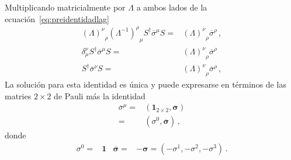 \begin{frame}
Multiplicando matricialmente por $\Lambda$ a ambos lados de la ecuación~\eqref{eq:preidentidadlag}
\begin{align}
\label{eq:ltrincond}
{\left(\Lambda\right)^\nu}_\rho{\left(\Lambda^{-1}\right)^\rho}_\mu   S^{\dagger}\overline{\sigma}^\mu S=&
{\left(\Lambda\right)^\nu}_\rho \overline{\sigma}^\rho\,,\nonumber\\
\delta^{\nu}_{\mu}   S^{\dagger}\overline{\sigma}^\mu S=&
{\left(\Lambda\right)^\nu}_\rho \overline{\sigma}^\rho \nonumber\\
S^{\dagger}\overline{\sigma}^\nu S=&{\left(\Lambda\right)^\nu}_\rho \overline{\sigma}^\rho\,,
\end{align}
La solución para esta identidad es única y puede expresarse en términos de las matries  $2\times2$ de Pauli más la identidad
   \begin{align} 
 \overline{\sigma}^{\mu}=& \left( \boldsymbol{1}_{2\times2},\overline{\boldsymbol{\sigma}} \right) \nonumber\\
 =& \left( \sigma^0,\overline{\boldsymbol{\sigma}} \right)\,, 
\end{align}
donde
\begin{align}
\sigma^0=& \boldsymbol{1} & \overline{\boldsymbol{\sigma}}=&-\boldsymbol{\sigma}=\left(-\sigma^1,-\sigma^2,-\sigma^3\right)\,.
\end{align}
\end{frame}
